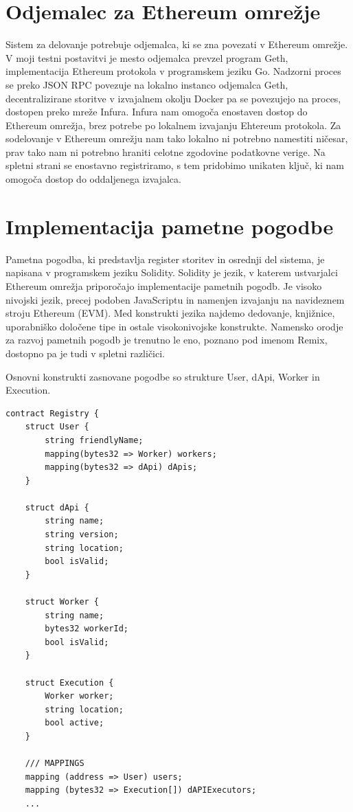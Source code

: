 \documentclass[a4paper, 12pt]{book}
\begin{document}
\section{Odjemalec za Ethereum omrežje}
Sistem za delovanje potrebuje odjemalca, ki se zna povezati v Ethereum omrežje.
V moji testni postavitvi je mesto odjemalca prevzel program Geth, implementacija Ethereum protokola v programskem jeziku Go. \cite{Geth}
Nadzorni proces se preko JSON RPC povezuje na lokalno instanco odjemalca Geth, decentralizirane storitve v izvajalnem okolju Docker pa se 
povezujejo na proces, dostopen preko mreže Infura.
Infura nam omogoča enostaven dostop do Ethereum omrežja, brez potrebe po lokalnem izvajanju Ehtereum protokola.
Za sodelovanje v Ethereum omrežju nam tako lokalno ni potrebno namestiti ničesar, prav tako nam ni potrebno hraniti
celotne zgodovine podatkovne verige. 
Na spletni strani se enostavno registriramo, s tem pridobimo unikaten ključ, ki nam omogoča dostop do oddaljenega izvajalca. \cite{Infura}

\section{Implementacija pametne pogodbe}
Pametna pogodba, ki predstavlja register storitev in osrednji del sistema, je napisana v programskem jeziku Solidity.
Solidity je jezik, v katerem ustvarjalci Ethereum omrežja priporočajo implementacije pametnih pogodb.
Je visoko nivojski jezik, precej podoben JavaScriptu in namenjen izvajanju na navideznem stroju Ethereum (EVM).
Med konstrukti jezika najdemo dedovanje, knjižnice, uporabniško določene tipe in ostale visokonivojske konstrukte.
Namensko orodje za razvoj pametnih pogodb je trenutno le eno, poznano pod imenom Remix, dostopno pa je tudi v spletni različici.
\cite{solidityDocs}

Osnovni konstrukti zasnovane pogodbe so strukture User, dApi, Worker in Execution.

\begin{lstlisting}
contract Registry {
	struct User {
		string friendlyName;
		mapping(bytes32 => Worker) workers;
		mapping(bytes32 => dApi) dApis;
	}
	
	struct dApi {
		string name;
		string version;
		string location;
		bool isValid;
	}
	
	struct Worker {
		string name;
		bytes32 workerId;
		bool isValid;
	}
	
	struct Execution {
		Worker worker;
		string location;
		bool active;
	}
	
 	/// MAPPINGS
	mapping (address => User) users;
	mapping (bytes32 => Execution[]) dAPIExecutors;
	...
\end{lstlisting}
\end{document}
